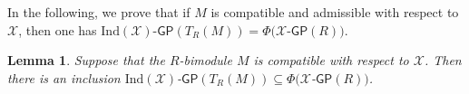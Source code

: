 \documentclass[10pt,twoside]{amsart}
\theoremstyle{bfupright head,slanted body}
\theoremstyle{bfupright head,upright body}
\theoremstyle{fixed bf head,slanted body}
\newtheorem{lem}[res]{Lemma}            \newtheorem*{lem*}{Lemma}
\theoremstyle{fixed bf head,upright body}
\theoremstyle{numbered paragraph}
\numberwithin{equation}{res}
\newcommand{\GP}{\mathsf{GP}}
\newcommand{\sfT}{\mathsf{T}}
\newcommand{\Proj}{\mathsf{Proj}}
\newcommand{\fd}{\mathrm{fd}}
\newcommand{\pd}{\mathrm{pd}}
\newcommand{\Ind}{\mathrm{Ind}}
\newcommand{\Rop}{R^{\sf op}}
\newcommand{\Tor}{\operatorname{Tor}}
\begin{document}


In the following, we prove that if $M$ is compatible and admissible with respect to $\mathcal{X}$,
then one has $\Ind(\mathcal{X})$-$\GP(T_R(M)) = \Phi(\mathcal{X}$-$\GP(R))$.

\begin{lem} \label{GPTRM in Phi}
Suppose that the $R$-bimodule $M$ is compatible with respect to $\mathcal{X}$. Then there is an inclusion
$\Ind(\mathcal{X})$-$\GP(T_R(M)) \subseteq \Phi(\mathcal{X}$-$\GP(R))$.
\end{lem}
\end{document}

